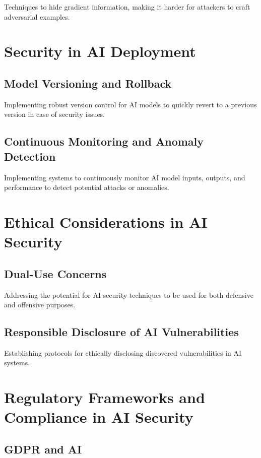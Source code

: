 \documentclass[
]{article}
\begin{document}
Techniques to hide gradient information, making it harder for attackers
to craft adversarial examples.

\section{Security in AI Deployment}

\subsection{Model Versioning and Rollback}

Implementing robust version control for AI models to quickly revert to a
previous version in case of security issues.

\subsection{Continuous Monitoring and Anomaly Detection}

Implementing systems to continuously monitor AI model inputs, outputs,
and performance to detect potential attacks or anomalies.

\section{Ethical Considerations in AI Security}

\subsection{Dual-Use Concerns}

Addressing the potential for AI security techniques to be used for both
defensive and offensive purposes.

\subsection{Responsible Disclosure of AI Vulnerabilities}

Establishing protocols for ethically disclosing discovered
vulnerabilities in AI systems.

\section{Regulatory Frameworks and Compliance in AI Security}

\subsection{GDPR and AI}
\end{document}

